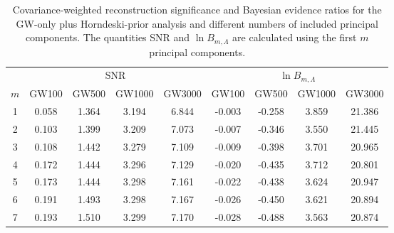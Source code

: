 \begin{table}[t]
\caption{
Covariance-weighted reconstruction significance and Bayesian evidence
ratios for the GW-only plus Horndeski-prior analysis and different
numbers of included principal components. The quantities SNR and
$\ln B_{m,\Lambda}$ are calculated using the first $m$ principal components.}
\label{tab:gw_prior_only_pca_snr_bayes}
\centering
\begin{ruledtabular}
\begin{tabular}{c|cccc|cccc}
& \multicolumn{4}{c|}{SNR}
& \multicolumn{4}{c}{$\ln B_{m,\Lambda}$}
\\
$m$
& GW100 & GW500 & GW1000 & GW3000
& GW100 & GW500 & GW1000 & GW3000
\\
\hline
1 & 0.058 & 1.364 & 3.194 & 6.844 & -0.003 & -0.258 & 3.859 & 21.386 \\
2 & 0.103 & 1.399 & 3.209 & 7.073 & -0.007 & -0.346 & 3.550 & 21.445 \\
3 & 0.108 & 1.442 & 3.279 & 7.109 & -0.009 & -0.398 & 3.701 & 20.965 \\
4 & 0.172 & 1.444 & 3.296 & 7.129 & -0.020 & -0.435 & 3.712 & 20.801 \\
5 & 0.173 & 1.444 & 3.298 & 7.161 & -0.022 & -0.438 & 3.624 & 20.947 \\
6 & 0.191 & 1.493 & 3.298 & 7.167 & -0.026 & -0.450 & 3.621 & 20.894 \\
7 & 0.193 & 1.510 & 3.299 & 7.170 & -0.028 & -0.488 & 3.563 & 20.874 \\
\end{tabular}
\end{ruledtabular}
\end{table}
